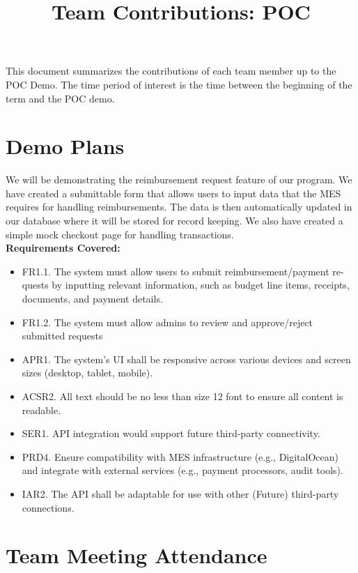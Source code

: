 \documentclass{article}
\title{Team Contributions: POC\\\progname}
\author{\authname}
\date{}
\begin{document}
\maketitle

This document summarizes the contributions of each team member up to the POC
Demo.  The time period of interest is the time between the beginning of the term
and the POC demo.

\section{Demo Plans}


We will be demonstrating the reimbursement request feature of our program. We have created a submittable form that allows users to input data that the MES requires for handling reimbursements. The data is then automatically updated in our database where it will be stored for record keeping. We also have created a simple mock checkout page for handling transactions.\\ 

\textbf{Requirements Covered: }

\begin{itemize}
    \item FR1.1. The system must allow users to submit reimbursement/payment re-
quests by inputting relevant information, such as budget line items, receipts,
documents, and payment details.
    \item FR1.2. The system must allow admins to review and approve/reject submitted
requests
    \item APR1. The system’s UI shall be responsive across various devices and screen
sizes (desktop, tablet, mobile).
    \item ACSR2. All text should be no less than size 12 font to ensure all content is
readable.
    \item SER1. API integration would support future third-party connectivity.
    \item PRD4. Ensure compatibility with MES infrastructure (e.g., DigitalOcean)
and integrate with external services (e.g., payment processors, audit tools).
    \item IAR2. The API shall be adaptable for use with other (Future) third-party
connections.
\end{itemize}

\section{Team Meeting Attendance}
\end{document}
